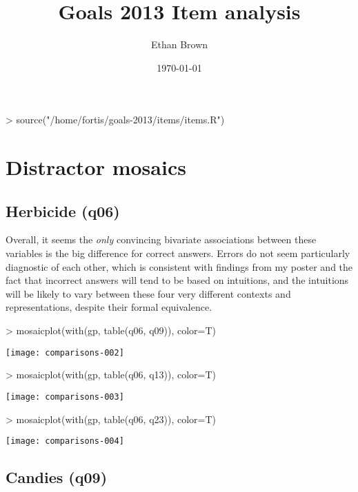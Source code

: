 \documentclass[11pt]{article}
\author{Ethan Brown}
\date{\today}
\title{Goals 2013 Item analysis}
\begin{document}
\maketitle
\begin{Schunk}
\begin{Sinput}
> source("/home/fortis/goals-2013/items/items.R")
\end{Sinput}
\end{Schunk}

\section{Distractor mosaics}
\label{sec-1}

\subsection{Herbicide (q06)}
\label{sec-1-1}
Overall, it seems the \emph{only} convincing bivariate associations between these variables is the big difference for correct answers.  Errors do not seem particularly diagnostic of each other, which is consistent with findings from my poster and the fact that incorrect answers will tend to be based on intuitions, and the intuitions will be likely to vary between these four very different contexts and representations, despite their formal equivalence.


\begin{Schunk}
\begin{Sinput}
> mosaicplot(with(gp, table(q06, q09)), color=T)
\end{Sinput}
\end{Schunk}
\texttt{[image: comparisons-002]}

\begin{Schunk}
\begin{Sinput}
> mosaicplot(with(gp, table(q06, q13)), color=T)
\end{Sinput}
\end{Schunk}
\texttt{[image: comparisons-003]}

\begin{Schunk}
\begin{Sinput}
> mosaicplot(with(gp, table(q06, q23)), color=T)
\end{Sinput}
\end{Schunk}
\texttt{[image: comparisons-004]}
\subsection{Candies (q09)}
\label{sec-1-2}
\end{document}
